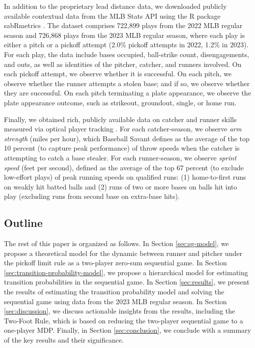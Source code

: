\documentclass[aoas]{imsart}
\begin{document}
    In addition to the proprietary lead distance data, we downloaded publicly available contextual data from the MLB Stats API using the R package sabRmetrics \citep{powers_sabrmetrics_2025}. The dataset comprises 722,899 plays from the 2022 MLB regular season and 726,868 plays from the 2023 MLB regular season, where each play is either a pitch or a pickoff attempt (2.0\% pickoff attempts in 2022, 1.2\% in 2023). For each play, the data include bases occupied, ball-strike count, disengagements, and outs, as well as identities of the pitcher, catcher, and runners involved. On each pickoff attempt, we observe whether it is successful. On each pitch, we observe whether the runner attempts a stolen base; and if so, we observe whether they are successful. On each pitch terminating a plate appearance, we observe the plate appearance outcome, such as strikeout, groundout, single, or home run.

    Finally, we obtained rich, publicly available data on catcher and runner skills measured via optical player tracking \citep{baseball_savant_statcast_2024}. For each catcher-season, we observe {\it arm strength} (miles per hour), which Baseball Savant defines as the average of the top 10 percent (to capture peak performance) of throw speeds when the catcher is attempting to catch a base stealer. For each runner-season, we observe {\it sprint speed} (feet per second), defined as the average of the top 67 percent (to exclude low-effort plays) of peak running speeds on qualified runs: (1) home-to-first runs on weakly hit batted balls and (2) runs of two or more bases on balls hit into play (excluding runs from second base on extra-base hits).

  \subsection{Outline}
  
    
    The rest of this paper is organized as follows. In Section \ref{sec:sg-model}, we propose a theoretical model for the dynamic between runner and pitcher under the pickoff limit rule as a two-player zero-sum sequential game. In Section \ref{sec:transition-probability-model}, we propose a hierarchical model for estimating transition probabilities in the sequential game. In Section \ref{sec:results}, we present the results of estimating the transition probability model and solving the sequential game using data from the 2023 MLB regular season. In Section \ref{sec:discussion}, we discuss actionable insights from the results, including the Two-Foot Rule, which is based on reducing the two-player sequential game to a one-player MDP. Finally, in Section \ref{sec:conclusion}, we conclude with a summary of the key results and their significance.
\end{document}
